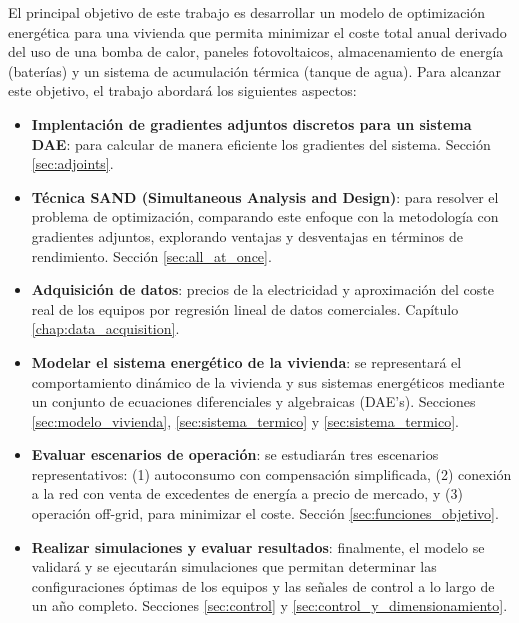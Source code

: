 El principal objetivo de este trabajo es desarrollar un modelo de optimización
energética para una vivienda que permita minimizar el coste total anual
derivado del uso de una bomba de calor, paneles fotovoltaicos, almacenamiento
de energía (baterías) y un sistema de acumulación térmica (tanque de agua).
Para alcanzar este objetivo, el trabajo abordará los siguientes aspectos:

\begin{itemize}
	\item \textbf{Implentación de gradientes adjuntos discretos para un sistema
		      DAE}: para calcular de manera eficiente los gradientes del sistema.
	      Sección \ref{sec:adjoints}.

	\item \textbf{Técnica SAND (Simultaneous Analysis and Design)}: para resolver
	      el problema de optimización, comparando este enfoque con la metodología con
	      gradientes adjuntos, explorando ventajas y desventajas en términos de
	      rendimiento. Sección \ref{sec:all_at_once}.

	\item \textbf{Adquisición de datos}: precios de la electricidad y aproximación
	      del coste real de los equipos por regresión lineal de datos comerciales.
	      Capítulo \ref{chap:data_acquisition}.

	\item \textbf{Modelar el sistema energético de la vivienda}: se representará
	      el comportamiento dinámico de la vivienda y sus sistemas energéticos mediante
	      un conjunto de ecuaciones diferenciales y algebraicas (DAE's). Secciones
	      \ref{sec:modelo_vivienda}, \ref{sec:sistema_termico} y
	      \ref{sec:sistema_termico}.

	\item \textbf{Evaluar escenarios de operación}: se estudiarán tres escenarios
	      representativos: (1) autoconsumo con compensación simplificada, (2) conexión
	      a la red con venta de excedentes de energía a precio de mercado, y (3)
	      operación off-grid, para minimizar el coste. Sección
	      \ref{sec:funciones_objetivo}.

	\item \textbf{Realizar simulaciones y evaluar resultados}: finalmente, el
	      modelo se validará y se ejecutarán simulaciones que permitan determinar las
	      configuraciones óptimas de los equipos y las señales de control a lo largo de
	      un año completo. Secciones \ref{sec:control} y
	      \ref{sec:control_y_dimensionamiento}.
\end{itemize}
